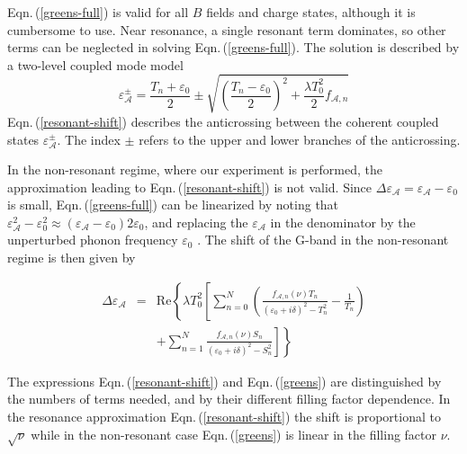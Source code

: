 \documentclass[prl,aps,superscriptaddress,showpacs,reprint]{revtex4-1}
\begin{document}
Eqn.\,(\ref{greens-full}) is valid for all $B$ fields and charge states, although it is cumbersome to use. Near resonance, a single resonant term dominates, so other terms can be neglected in solving Eqn.\,(\ref{greens-full}). The solution is described by a two-level coupled mode model \cite{yan2010observation,PhysRevLett.110.227402}
\begin{equation}
\label{resonant-shift}
\varepsilon_{\mathcal{A}}^{\pm}=\frac{T_n+\varepsilon_0}{2}\pm\sqrt{\left(\frac{T_n-\varepsilon_0}{2}\right)^2+\frac{\lambda T_0^2}{2}f_{\mathcal{A},n}}
\end{equation}
Eqn.\,(\ref{resonant-shift}) describes the anticrossing between the coherent coupled states $\varepsilon_{\mathcal{A}}^{\pm}$. The index $\pm$ refers to the upper and lower branches of the anticrossing.

In the non-resonant regime, where our experiment is performed, the approximation leading to Eqn.\,(\ref{resonant-shift}) is not valid. Since  $\Delta\varepsilon_{\mathcal{A}} = \varepsilon_{\mathcal{A}} - \varepsilon_0$ is small, Eqn.\,(\ref{greens-full}) can be linearized by noting that $\varepsilon_{\mathcal{A}}^2-\varepsilon_0^2 \approx (\varepsilon_{\mathcal{A}}-\varepsilon_0)2\varepsilon_0$, and  replacing the $\varepsilon_{\mathcal{A}}$ in the denominator by the unperturbed phonon frequency $\varepsilon_0$ \cite{ando2007magnetic}. The shift of the G-band in the non-resonant regime is then given by

\begin{eqnarray}
\label{greens}
\Delta\varepsilon_{\mathcal{A}} &=& \mathrm{Re}\left\lbrace \lambda T_0^2 \left[ \sum_{n=0}^N\left(\frac{f_{\mathcal{A},n}\left(\nu\right) T_n}{\left(\varepsilon_{0}+i\delta\right)^2-T_n^2}-\frac{1}{T_n}\right)\right.\right.\nonumber \\
& &\left.\left. +\sum_{n=1}^{N}\frac{f_{\mathcal{A},n}\left(\nu\right) S_n}{\left(\varepsilon_{0}+i\delta\right)^2-S_n^2}\right]\right\rbrace
\end{eqnarray}

The expressions Eqn.\,(\ref{resonant-shift}) and Eqn.\,(\ref{greens}) are distinguished by  the numbers of terms needed, and by their different  filling factor dependence. In the resonance approximation Eqn.\,(\ref{resonant-shift}) the shift is proportional to $ \sqrt{\nu}$ while in the non-resonant case Eqn.\,(\ref{greens}) is linear in the filling factor $\nu$.
\end{document}
